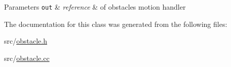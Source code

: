 \begin{DoxyParams}[1]{Parameters}
\mbox{\tt out}  & {\em reference} & of obstacle\textquotesingle{}s motion handler \\
\hline
\end{DoxyParams}


The documentation for this class was generated from the following files\+:\begin{DoxyCompactItemize}
\item 
src/\hyperlink{obstacle_8h}{obstacle.\+h}\item 
src/\hyperlink{obstacle_8cc}{obstacle.\+cc}\end{DoxyCompactItemize}
